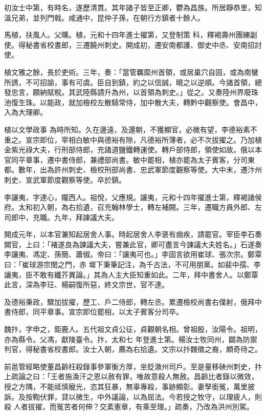 \begin{pinyinscope}
 初汝士中第，有時名，遂歷清貫。其年諸子皆至正卿，鬱為昌族。所居靜恭里，知溫兄弟，並列門戟。咸通中，昆仲子孫，在朝行方鎮者十餘人。



 馬植，扶風人。父曛。植，元和十四年進士擢第，又登制策
 科，釋褐壽州團練副使。得秘書省校書郎，三遷饒州刺史。開成初，遷安南都護、御史中丞、安南招討使。



 植文雅之餘，長於吏術。三年，奏：「當管羈縻州首領，或居巢穴自固，或為南蠻所誘，不可招諭，事有可虞。臣自到鎮，約之以信誠，曉之以逆順。今諸首領，總發忠言，願納賦稅。其武陸縣請升為州，以首領為刺史。」從之。又奏陸州界廢珠池復生珠。以能政，就加檢校左散騎常侍，加中散大夫，轉黔中觀察使。會昌中，入為大理卿。



 植以文學政事
 為時所知。久在邊遠，及還朝，不獲顯官，必微有望，李德裕素不重之。宣宗即位，宰相白敏中與德裕有隙，凡德裕所薄者，必不次拔擢之。乃加植金紫光祿大夫，行刑部侍郎，充諸道鹽鐵轉運使。轉戶部侍郎，領使如故。俄以本官同平章事，遷中書侍郎，兼禮部尚書。敏中罷相，植亦罷為太子賓客，分司東都。數年，出為許州刺史、檢校刑部尚書、忠武軍節度觀察等使。大中末，遷汴州刺史、宣武軍節度觀察等使。卒於鎮。



 李讓夷，字達心，隴西人。祖悅，父應規。讓夷，元和十四年擢進士第，釋褐諸侯府。太和初入朝，為右拾遺，召充翰林學士，轉左補闕。三年，遷職方員外郎、左司郎中，充職。九年，拜諫議大夫。



 開成元年，以本官兼知起居舍人事。時起居舍人李褒有痼疾，請罷官。宰臣李石奏闕官，上曰：「褚遂良為諫議大夫，嘗兼此官，卿可盡言今諫議大夫姓名。」石遂奏李讓夷、馮定、孫簡、蕭俶。帝曰：「讓夷可也。」李固言欲用崔球、張次宗。鄭覃曰：「崔球游宗閔之門，赤
 墀下秉筆記注，為千古法，不可用朋黨。如裴中孺、李讓夷，臣不敢有纖芥異論。」其為人主大臣知重如此。二年，拜中書舍人。以鄭覃此言，深為李玨、楊嗣復所惡，終文宗世，官不達。



 及德裕秉政，驟加拔擢，歷工、戶二侍郎，轉左丞。累遷檢校尚書右僕射，俄拜中書侍郎，同平章事。宣宗即位罷相，以太子賓客分司卒。



 魏抃，字申之，鉅鹿人。五代祖文貞公征，貞觀朝名相。曾祖殷，汝陽令。祖明，亦為縣令。父馮，獻陵臺令。抃，太和七
 年登進士第。楊汝士牧同州，闢為防禦判官，得秘書省校書郎。汝士入朝，薦為右拾遺。文宗以抃魏徵之裔，頗奇待之。



 前邕管經略使董昌齡枉殺錄事參軍衡方厚，坐貶漵州司戶。至是量移硤州刺史，抃上疏論之曰：「王者施渙汗之恩以赦有罪，唯故意殺人無赦。昌齡比者錄以微效，授之方隅，不能祗慎寵光，恣其狂暴，無辜專殺，事跡顯彰。妻孥銜冤，萬里披訴。及按鞫伏罪，貸以微生，中外議論，以為屈法。今若授之牧守，以理疲人，則殺
 人者拔擢，而冤苦者何伸？交紊憲章，有乘至理。」疏奏，乃改為洪州別駕。




\end{pinyinscope}
